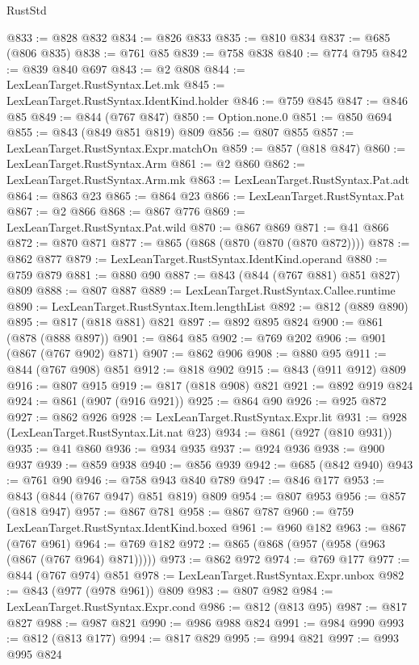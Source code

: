 \begin{lexlean}{RustStd}
\begin{coremodule}
@833 := @828 @832
@834 := @826 @833
@835 := @810 @834
@837 := @685 (@806 @835)
@838 := @761 @85
@839 := @758 @838
@840 := @774 @795
@842 := @839 @840 @697
@843 := @2 @808
@844 := LexLeanTarget.RustSyntax.Let.mk
@845 := LexLeanTarget.RustSyntax.IdentKind.holder
@846 := @759 @845
@847 := @846 @85
@849 := @844 (@767 @847)
@850 := Option.none.{0}
@851 := @850 @694
@855 := @843 (@849 @851 @819) @809
@856 := @807 @855
@857 := LexLeanTarget.RustSyntax.Expr.matchOn
@859 := @857 (@818 @847)
@860 := LexLeanTarget.RustSyntax.Arm
@861 := @2 @860
@862 := LexLeanTarget.RustSyntax.Arm.mk
@863 := LexLeanTarget.RustSyntax.Pat.adt
@864 := @863 @23
@865 := @864 @23
@866 := LexLeanTarget.RustSyntax.Pat
@867 := @2 @866
@868 := @867 @776
@869 := LexLeanTarget.RustSyntax.Pat.wild
@870 := @867 @869
@871 := @41 @866
@872 := @870 @871
@877 := @865 (@868 (@870 (@870 (@870 @872))))
@878 := @862 @877
@879 := LexLeanTarget.RustSyntax.IdentKind.operand
@880 := @759 @879
@881 := @880 @90
@887 := @843 (@844 (@767 @881) @851 @827) @809
@888 := @807 @887
@889 := LexLeanTarget.RustSyntax.Callee.runtime
@890 := LexLeanTarget.RustSyntax.Item.lengthList
@892 := @812 (@889 @890)
@895 := @817 (@818 @881) @821
@897 := @892 @895 @824
@900 := @861 (@878 (@888 @897))
@901 := @864 @85
@902 := @769 @202
@906 := @901 (@867 (@767 @902) @871)
@907 := @862 @906
@908 := @880 @95
@911 := @844 (@767 @908) @851
@912 := @818 @902
@915 := @843 (@911 @912) @809
@916 := @807 @915
@919 := @817 (@818 @908) @821
@921 := @892 @919 @824
@924 := @861 (@907 (@916 @921))
@925 := @864 @90
@926 := @925 @872
@927 := @862 @926
@928 := LexLeanTarget.RustSyntax.Expr.lit
@931 := @928 (LexLeanTarget.RustSyntax.Lit.nat @23)
@934 := @861 (@927 (@810 @931))
@935 := @41 @860
@936 := @934 @935
@937 := @924 @936
@938 := @900 @937
@939 := @859 @938
@940 := @856 @939
@942 := @685 (@842 @940)
@943 := @761 @90
@946 := @758 @943 @840 @789
@947 := @846 @177
@953 := @843 (@844 (@767 @947) @851 @819) @809
@954 := @807 @953
@956 := @857 (@818 @947)
@957 := @867 @781
@958 := @867 @787
@960 := @759 LexLeanTarget.RustSyntax.IdentKind.boxed
@961 := @960 @182
@963 := @867 (@767 @961)
@964 := @769 @182
@972 := @865 (@868 (@957 (@958 (@963 (@867 (@767 @964) @871)))))
@973 := @862 @972
@974 := @769 @177
@977 := @844 (@767 @974) @851
@978 := LexLeanTarget.RustSyntax.Expr.unbox
@982 := @843 (@977 (@978 @961)) @809
@983 := @807 @982
@984 := LexLeanTarget.RustSyntax.Expr.cond
@986 := @812 (@813 @95)
@987 := @817 @827
@988 := @987 @821
@990 := @986 @988 @824
@991 := @984 @990
@993 := @812 (@813 @177)
@994 := @817 @829
@995 := @994 @821
@997 := @993 @995 @824

\end{coremodule}
\end{lexlean}
